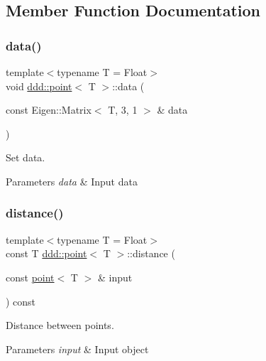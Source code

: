 \subsection{Member Function Documentation}
\mbox{\label{classddd_1_1point_a8bc0f2072cb816a9a4128220fb4438af}} 
\subsubsection{\texorpdfstring{data()}{data()}}
{\footnotesize\ttfamily template$<$typename T = Float$>$ \\
void \hyperlink{classddd_1_1point}{ddd\+::point}$<$ T $>$\+::data (\begin{DoxyParamCaption}\item[{const Eigen\+::\+Matrix$<$ T, 3, 1 $>$ \&}]{data }\end{DoxyParamCaption})\hspace{0.3cm}{\ttfamily [inline]}}



Set data. 


\begin{DoxyParams}{Parameters}
{\em data} & Input data \\
\hline
\end{DoxyParams}
\mbox{\label{classddd_1_1point_a59d8714cc178090ddf75b0c9dbd832c9}} 
\subsubsection{\texorpdfstring{distance()}{distance()}}
{\footnotesize\ttfamily template$<$typename T = Float$>$ \\
const T \hyperlink{classddd_1_1point}{ddd\+::point}$<$ T $>$\+::distance (\begin{DoxyParamCaption}\item[{const \hyperlink{classddd_1_1point}{point}$<$ T $>$ \&}]{input }\end{DoxyParamCaption}) const\hspace{0.3cm}{\ttfamily [inline]}}



Distance between points. 


\begin{DoxyParams}{Parameters}
{\em input} & Input object \\
\hline
\end{DoxyParams}
\mbox{\label{classddd_1_1point_a4b6793fd154fc9ad4dd93a4927d4ee13}} 
